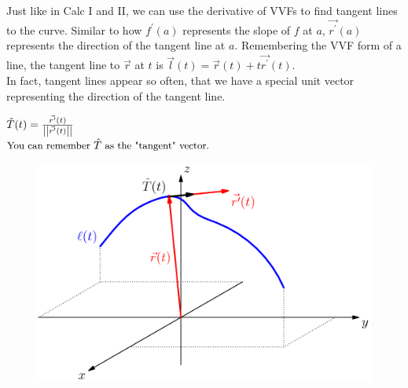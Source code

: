 \noindent
Just like in Calc I and II, we can use the derivative of VVFs to find tangent lines to the curve. Similar to how $f^{\prime}(a)$ represents the slope of $f$ at $a$, $\vec{r^\prime}(a)$ represents the direction of the tangent line at $a$. Remembering the VVF form of a line, the tangent line to $\vec{r}$ at $t$ is $\vec{l}(t)=\vec{r}(t)+t\vec{r^\prime}(t)$.\\
In fact, tangent lines appear so often, that we have a special unit vector representing the direction of the tangent line.
\begin{center}
	$\hat{T}(t) = \frac{\vec{r^\prime}(t)}{\left|\left|\vec{r^\prime}(t)\right|\right|}$\\
	$\small{\text{You can remember }\hat{T}\text{ as the "tangent" vector.}}$
\end{center}

\begin{figure}[h]
	\centering
	\includegraphics[scale=0.33]{Images/vectorValuedFunctions/TangentVector}
\end{figure}